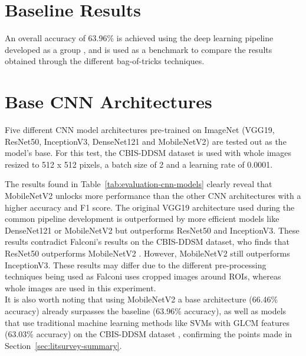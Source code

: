 
\section{Baseline Results}

An overall accuracy of 63.96\% is achieved using the deep learning pipeline developed as a group \citep{adam_jaamour_2020_3975093}, and is used as a benchmark to compare the results obtained through the different bag-of-tricks techniques.


\section{Base CNN Architectures}
\label{sec:evaluation-cnn-model-experiment}

Five different CNN model architectures pre-trained on ImageNet (VGG19, ResNet50, InceptionV3, DenseNet121 and MobileNetV2) are tested out as the model's base. For this test, the CBIS-DDSM dataset is used with whole images resized to 512 x 512 pixels, a batch size of 2 and a learning rate of 0.0001.



The results found in Table~\ref{tab:evaluation-cnn-models} clearly reveal that MobileNetV2 unlocks more performance than the other CNN architectures with a higher accuracy and F1 score. The original VGG19 architecture used during the common pipeline development is outperformed by more efficient models like DenseNet121 or MobileNetV2 but outperforms ResNet50 and InceptionV3. These results contradict Falconi's results on the CBIS-DDSM dataset, who finds that ResNet50 outperforms MobileNetV2 \citep{Falconi2019}. However, MobileNetV2 still outperforms InceptionV3. These results may differ due to the different pre-processing techniques being used as Falconi uses cropped images around ROIs, whereas whole images are  used in  this experiment.\\

It is also worth noting that using MobileNetV2 a base architecture (66.46\% accuracy) already surpasses the baseline (63.96\% accuracy), as  well as models that use traditional machine learning methods like SVMs with GLCM features (63.03\% accuracy) on the CBIS-DDSM dataset \citep{Sarosa2018}, confirming the points made in Section~\ref{sec:litsurvey-summary}.\\

